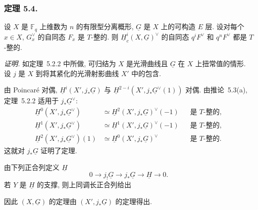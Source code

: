 \subsubsection*{定理 5.4.}
设 $X$ 是 $\mathbb F_q$ 上维数为 $n$ 的有限型分离概形,
$\underline G$ 是 $X$ 上的可构造 $E$ 层. 设对每个 $x\in X$,
$G_x^\vee$ 的自同态 $F_x$ 是 $T$-整的. 则 $\underline H_c^i(X,\underline G)^\vee$
的自同态 $q^iF^\vee$ 和 $q^nF^\vee$ 都是 $T$-整的.

\medskip
\noindent\emph{证明.}
如定理~5.2.2 中所做, 可归结为 $X$ 是光滑曲线且 $\underline G$ 在 $X$ 上扭常值的情形.
设 $j$ 是 $X$ 到将其紧化的光滑射影曲线 $X'$ 中的包含.

由 Poincar\'e 对偶, $\underline H^i(X',j_*\underline G)$ 与
$\underline H^{2-i}(X',j_*\underline G^\vee(1))$ 对偶.
由推论~5.3(a), 定理~5.2.2 适用于 $j_*\underline G^\vee$:
\begin{align*}
\underline H^0(X',j_*\underline G^\vee)
  &\simeq \underline H^2(X',j_*\underline G)^\vee(-1)
  &&\text{是 \(T\)-整的},\\
\underline H^1(X',j_*\underline G^\vee)
  &\simeq \underline H^1(X',j_*\underline G)^\vee(-1)
  &&\text{是 \(T\)-整的},\\
\underline H^2(X',j_*\underline G^\vee)(1)
  &\simeq \underline H^0(X',j_*\underline G)^\vee
  &&\text{是 \(T\)-整的}.
\end{align*}
这就对 $j_*\underline G$ 证明了定理.

由下列正合列定义 $\underline H$
\[
0\longrightarrow j_!\underline G\longrightarrow j_*\underline G
\longrightarrow\underline H\longrightarrow0.
\]
若 $Y$ 是 $\underline H$ 的支撑, 则上同调长正合列给出
\begin{center}
\end{center}
因此 $(X,\underline G)$ 的定理由 $(X',j_*\underline G)$ 的定理得出.
